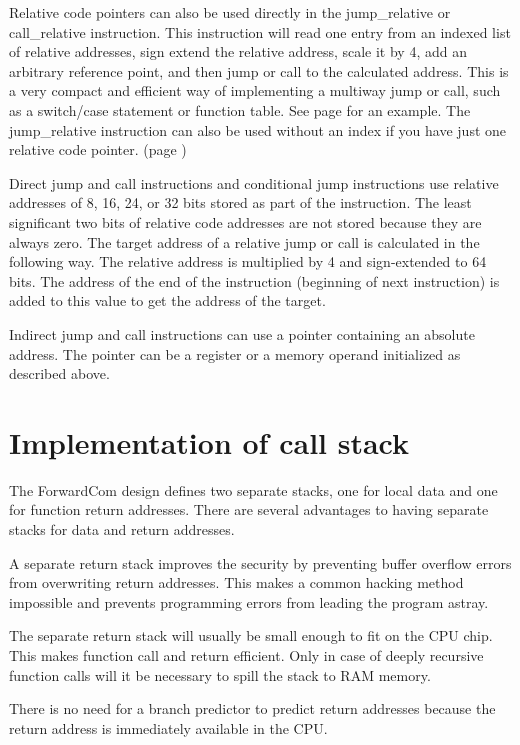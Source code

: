 \documentclass[forwardcom.tex]{subfiles}
\begin{document}
Relative code pointers can also be used directly in the jump\_relative or call\_relative instruction. 
This instruction will read one entry from an indexed list of relative addresses, sign extend the relative address, scale it by 4, add an arbitrary reference point, and then jump or call to the calculated address. This is a very compact and efficient way of implementing a multiway jump or call, such as a switch/case statement or function table. 
See page \pageref{exampleSwitchCase} for an example. The jump\_relative  instruction can also be used without an index if you have just one relative code pointer. (page \pageref{exampleRelFuncPointer})
\vspace{4mm}

Direct jump and call instructions and conditional jump instructions use relative addresses of 8, 16, 24, or 32 bits stored as part of the instruction. The least significant two bits of relative code addresses are not stored because they are always zero. The target address of a relative jump or call is calculated in the following way. The relative address is multiplied by 4 and sign-extended to 64 bits. The address of the end of the instruction (beginning of next instruction) is added to this value to get the address of the target. \vv

Indirect jump and call instructions can use a pointer containing an absolute address. 
The pointer can be a register or a memory operand initialized as described above. 
\vv

\section{Implementation of call stack} \label{callStackAlternatives}
The ForwardCom design defines two separate stacks, one for local data and one for function return addresses. There are several advantages to having separate stacks for data and return addresses. 
\vv

A separate return stack improves the security by preventing buffer overflow errors from overwriting return addresses. This makes a common hacking method impossible and prevents programming errors from leading the program astray.
\vv

The separate return stack will usually be small enough to fit on the CPU chip. This makes function call and return efficient. Only in case of deeply recursive function calls will it be necessary to spill the stack to RAM memory.
\vv

There is no need for a branch predictor to predict return addresses because the return address is immediately available in the CPU.
\vv
\end{document}

